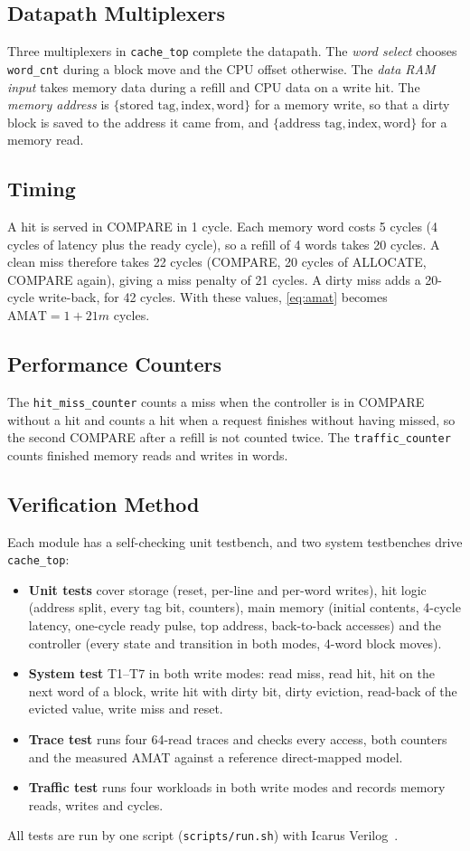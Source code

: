 \documentclass[conference]{IEEEtran}
\newcommand{\sig}[1]{\texttt{#1}}
\begin{document}
\subsection{Datapath Multiplexers}
Three multiplexers in \sig{cache\_top} complete the datapath. The \emph{word select} chooses \sig{word\_cnt} during a block move and the CPU offset otherwise. The \emph{data RAM input} takes memory data during a refill and CPU data on a write hit. The \emph{memory address} is $\{\text{stored tag}, \text{index}, \text{word}\}$ for a memory write, so that a dirty block is saved to the address it came from, and $\{\text{address tag}, \text{index}, \text{word}\}$ for a memory read.

\subsection{Timing}
A hit is served in COMPARE in 1 cycle. Each memory word costs 5 cycles (4 cycles of latency plus the ready cycle), so a refill of 4 words takes 20 cycles. A clean miss therefore takes 22 cycles (COMPARE, 20 cycles of ALLOCATE, COMPARE again), giving a miss penalty of 21 cycles. A dirty miss adds a 20-cycle write-back, for 42 cycles. With these values, \eqref{eq:amat} becomes $\text{AMAT} = 1 + 21m$ cycles.

\subsection{Performance Counters}
The \sig{hit\_miss\_counter} counts a miss when the controller is in COMPARE without a hit and counts a hit when a request finishes without having missed, so the second COMPARE after a refill is not counted twice. The \sig{traffic\_counter} counts finished memory reads and writes in words.

\subsection{Verification Method}
Each module has a self-checking unit testbench, and two system testbenches drive \sig{cache\_top}:
\begin{itemize}
\item \textbf{Unit tests} cover storage (reset, per-line and per-word writes), hit logic (address split, every tag bit, counters), main memory (initial contents, 4-cycle latency, one-cycle ready pulse, top address, back-to-back accesses) and the controller (every state and transition in both modes, 4-word block moves).
\item \textbf{System test} T1--T7 in both write modes: read miss, read hit, hit on the next word of a block, write hit with dirty bit, dirty eviction, read-back of the evicted value, write miss and reset.
\item \textbf{Trace test} runs four 64-read traces and checks every access, both counters and the measured AMAT against a reference direct-mapped model.
\item \textbf{Traffic test} runs four workloads in both write modes and records memory reads, writes and cycles.
\end{itemize}
All tests are run by one script (\texttt{scripts/run.sh}) with Icarus Verilog~\cite{icarus}.
\end{document}
